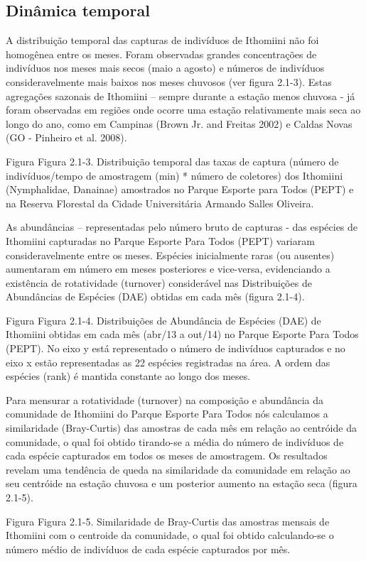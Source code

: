 \subsection{Dinâmica temporal} %
\label{sec:dinamica-temporal-borb}
A distribuição temporal das capturas de indivíduos de Ithomiini não foi homogênea entre os meses. Foram observadas grandes concentrações de indivíduos nos meses mais secos (maio a agosto) e números de indivíduos consideravelmente mais baixos nos meses chuvosos (ver figura 2.1-3). Estas agregações sazonais de Ithomiini – sempre durante a estação menos chuvosa - já foram observadas em regiões onde ocorre uma estação relativamente mais seca ao longo do ano, como em Campinas (Brown Jr. and Freitas 2002) e Caldas Novas (GO - Pinheiro et al. 2008). 

Figura
Figura 2.1-3. Distribuição temporal das taxas de captura (número de indivíduos/tempo de amostragem (min) * número de coletores) dos Ithomiini (Nymphalidae, Danainae) amostrados no Parque Esporte para Todos (PEPT) e na Reserva Florestal da Cidade Universitária Armando Salles Oliveira.

As abundâncias – representadas pelo número bruto de capturas - das espécies de Ithomiini capturadas no Parque Esporte Para Todos (PEPT) variaram consideravelmente entre os meses. Espécies inicialmente raras (ou ausentes) aumentaram em número em meses posteriores e vice-versa, evidenciando a existência de rotatividade (turnover) considerável nas Distribuições de Abundâncias de Espécies (DAE) obtidas em cada mês (figura 2.1-4).  

Figura
Figura 2.1-4. Distribuições de Abundância de Espécies (DAE) de Ithomiini obtidas em cada mês (abr/13 a out/14) no Parque Esporte Para Todos (PEPT). No eixo y está representado o número de indivíduos capturados e no eixo x estão representadas as 22 espécies registradas na área. A ordem das espécies (rank) é mantida constante ao longo dos meses.

Para mensurar a rotatividade (turnover) na composição e abundância da comunidade de Ithomiini do Parque Esporte Para Todos nós calculamos a similaridade (Bray-Curtis) das amostras de cada mês em relação ao centróide da comunidade, o qual foi obtido tirando-se a média do número de indivíduos de cada espécie capturados em todos os meses de amostragem. Os resultados revelam uma tendência de queda na similaridade da comunidade em relação ao seu centróide na estação chuvosa e um posterior aumento na estação seca (figura 2.1-5).

Figura
Figura 2.1-5. Similaridade de Bray-Curtis das amostras mensais de Ithomiini com o centroide da comunidade, o qual foi obtido calculando-se o número médio de indivíduos de cada espécie capturados por mês.

